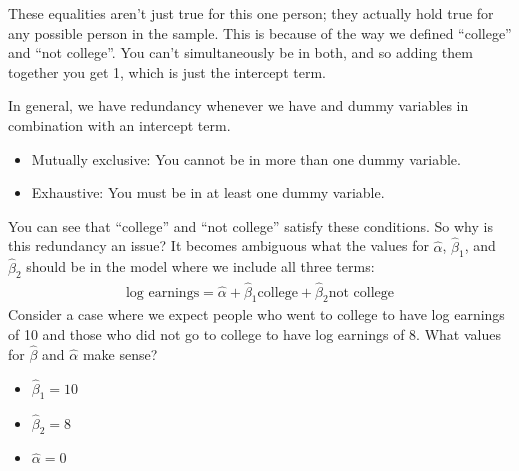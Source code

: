 \documentclass[letterpaper,10pt,english]{jupyterBook}
\begin{document}
\sphinxAtStartPar
These equalities aren’t just true for this one person; they actually hold true for any possible person in the sample. This is because of the way we defined “college” and “not college”. You can’t simultaneously be in both, and so adding them together you get 1, which is just the intercept term.

\sphinxAtStartPar
In general, we have redundancy whenever we have  and  dummy variables in combination with an intercept term.
\begin{itemize}
\item {} 
\sphinxAtStartPar
Mutually exclusive: You cannot be in more than one dummy variable.

\item {} 
\sphinxAtStartPar
Exhaustive: You must be in at least one dummy variable.

\end{itemize}

\sphinxAtStartPar
You can see that “college” and “not college” satisfy these conditions. So why is this redundancy an issue? It becomes ambiguous what the values for \(\hat{\alpha}\), \(\hat{\beta}_1\), and \(\hat{\beta}_2\) should be in the model where we include all three terms:
\begin{equation*}
\begin{split}
\text{log earnings} = \hat{\alpha} + \hat{\beta}_1 \text{college} + \hat{\beta}_2 \text{not college}
\end{split}
\end{equation*}
\sphinxAtStartPar
Consider a case where we expect people who went to college to have log earnings of 10 and those who did not go to college to have log earnings of 8. What values for \(\hat{\beta}\) and \(\hat{\alpha}\) make sense?
\begin{itemize}
\item {} 
\sphinxAtStartPar
\(\hat{\beta}_1 = 10\)

\item {} 
\sphinxAtStartPar
\(\hat{\beta}_2 = 8\)

\item {} 
\sphinxAtStartPar
\(\hat{\alpha} = 0\)

\end{itemize}
\end{document}
